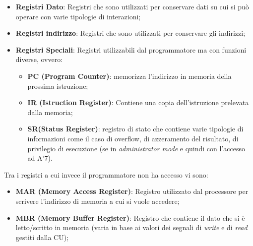 \begin{itemize}
    \item \textbf{Registri Dato}: Registri che sono utilizzati per conservare dati su cui si può operare con varie tipologie di interazioni;
    \item \textbf{Registri indirizzo}: Registri che sono utilizzati per conservare gli indirizzi;
    \item \textbf{Registri Speciali}: Registri utilizzabili dal programmatore ma con funzioni diverse, ovvero:
    \begin{itemize}
        \item \textbf{PC (Program Counter)}: memorizza l'indirizzo in memoria della prossima istruzione;
        \item \textbf{IR (Istruction Register)}: Contiene una copia dell'istruzione prelevata dalla memoria;
        \item \textbf{SR(Status Register)}: registro di stato che contiene varie tipologie di informazioni come il caso di overflow, di azzeramento del risultato, di privilegio di esecuzione (se in \textit{administrator mode} e quindi con l'accesso ad A'7).
    \end{itemize}
\end{itemize}

Tra i registri a cui invece il programmatore non ha accesso vi sono:
\begin{itemize}
    \item \textbf{MAR (Memory Access Register)}: Registro utilizzato dal processore per scrivere l'indirizzo di memoria a cui si vuole accedere;
    \item \textbf{MBR (Memory Buffer Register)}: Registro che contiene il dato che si è letto/scritto in memoria (varia in base ai valori dei segnali di \textit{write} e di \textit{read} gestiti dalla CU);
\end{itemize}


